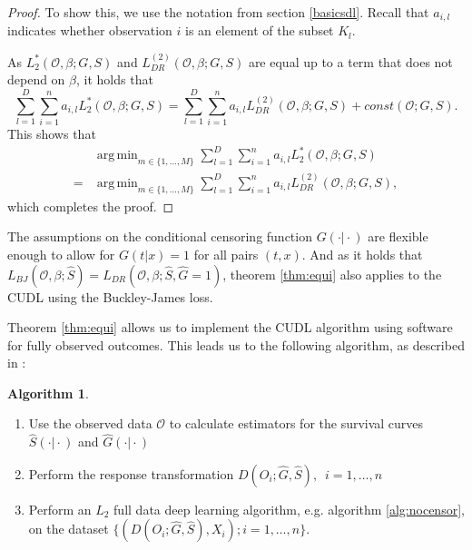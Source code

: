 \documentclass[12pt, a4paper]{scrartcl}
\theoremstyle{definition}
\newtheorem{Algorithm}{Algorithm}[section]
\theoremstyle{plain}
\numberwithin{equation}{section}
\numberwithin{figure}{section}
\numberwithin{table}{section}
\DeclareMathOperator*{\argmin}{arg\,min}
\begin{document}
\begin{proof}
		To show this, we use the notation from section \ref{basicsdl}.
		Recall that $a_{i,l}$ indicates whether observation $i$ is an element of the subset $K_l$.
		
		As $L_2^*(\mathcal{O}, \beta; G,S)$ and $L_{DR}^{(2)}(\mathcal{O}, \beta; G,S)$ are equal up to a term that does not depend on $\beta$, it holds that
		\begin{equation*}
		\sum_{l=1}^{D} \sum_{i=1}^{n} a_{i,l} L_2^*(\mathcal{O}, \beta; G,S) = \sum_{l=1}^{D} \sum_{i=1}^{n} a_{i,l} L_{DR}^{(2)}(\mathcal{O}, \beta; G,S) + const(\mathcal{O}; G,S).
		\end{equation*}
		This shows that
		\begin{equation*}
		\begin{split}
		 &\argmin_{m \in \{1,\dots, M\}}\sum_{l=1}^{D} \sum_{i=1}^{n} a_{i,l} L_2^*(\mathcal{O}, \beta; G,S)\\
		  = &\argmin_{m \in \{1,\dots, M\}}\sum_{l=1}^{D} \sum_{i=1}^{n} a_{i,l} L_{DR}^{(2)}(\mathcal{O}, \beta; G,S),
		 \end{split}
		\end{equation*}
		which completes the proof.
	\end{proof}

	The assumptions on the conditional censoring function $G(\cdot\vert\cdot)$ are flexible enough to allow for $G(t\vert x)=1$ for all pairs $(t,x)$.
	And as it holds that $L_{BJ}(\mathcal{O}, \beta; \hat{S})=L_{DR}(\mathcal{O}, \beta; \hat{S}, \hat{G} = 1)$, theorem \ref{thm:equi} also applies to the CUDL using the Buckley-James loss.
	
	Theorem \ref{thm:equi} allows us to implement the CUDL algorithm using software for fully observed outcomes.
	This leads us to the following algorithm, as described in \citet*{basearticle}:
	\begin{Algorithm}\label{alg:censor}~
		\begin{enumerate}
			\item Use the observed data $\mathcal{O}$ to calculate estimators for the survival curves $\hat{S}(\cdot\vert\cdot)$ and $\hat{G}(\cdot\vert\cdot)$
			\item Perform the response transformation $D(O_i; \hat{G},\hat{S}),$~$ i = 1,\dots,n$
			\item Perform an $L_2$ full data deep learning algorithm, e.g. algorithm \ref{alg:nocensor}, on the dataset $\{(D(O_i; \hat{G},\hat{S}), X_i); i = 1,\dots,n\}$.
		\end{enumerate}
	\end{Algorithm}
\end{document}

